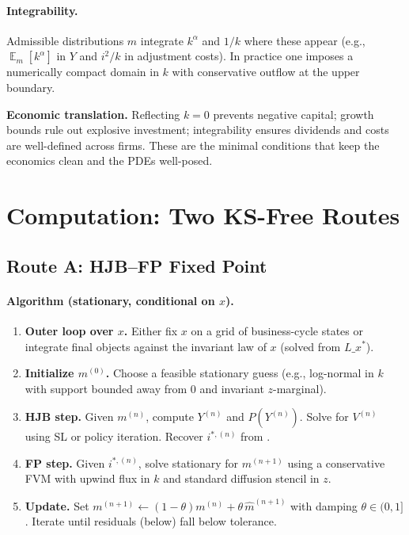 ﻿\documentclass[11pt,letterpaper,oneside]{article}
\numberwithin{equation}{section}
\newcommand{\ac}[1]{{\mdseries\textsc{#1}}}
\DeclareMathOperator{\E}{\mathbb{E}}
\newcommand{\1}{\mathbf{1}}
\newcommand{\Lx}{L\_x}
\begin{document}
\paragraph{Integrability.} Admissible distributions $m$ integrate $k^\alpha$ and $1/k$ where these appear (e.g., $\E_m[k^\alpha]$ in $Y$ and $i^2/k$ in adjustment costs). In practice one imposes a numerically compact domain in $k$ with conservative outflow at the upper boundary.

\begin{tcolorbox}[didacticstyle]
\textbf{Economic translation.} Reflecting $k=0$ prevents negative capital; growth bounds rule out explosive investment; integrability ensures dividends and costs are well-defined across firms. These are the minimal conditions that keep the economics clean and the PDEs well-posed.
\end{tcolorbox}

\section{Computation: Two KS-Free Routes}

\subsection{Route A: \ac{HJB}--\ac{FP} Fixed Point}\label{sec:routeA}

\paragraph{Algorithm (stationary, conditional on $x$).}
\begin{enumerate}[leftmargin=1.5em,label=\textbf{A.\arabic*}]
\item \textbf{Outer loop over $x$.} Either fix $x$ on a grid of business-cycle states or integrate final objects against the invariant law of $x$ (solved from $\Lx^\ast$).
\item \textbf{Initialize $m^{(0)}$.} Choose a feasible stationary guess (e.g., log-normal in $k$ with support bounded away from $0$ and invariant $z$-marginal).
\item \textbf{HJB step.} Given $m^{(n)}$, compute $Y^{(n)}$ and $P(Y^{(n)})$. Solve  for $V^{(n)}$ using \ac{SL} or policy iteration. Recover $i^{*,(n)}$ from .
\item \textbf{FP step.} Given $i^{*,(n)}$, solve stationary  for $m^{(n+1)}$ using a conservative \ac{FVM} with upwind flux in $k$ and standard diffusion stencil in $z$.
\item \textbf{Update.} Set $m^{(n+1)}\leftarrow (1-\theta)m^{(n)}+\theta\,\widehat m^{(n+1)}$ with damping $\theta\in(0,1]$. Iterate until residuals (below) fall below tolerance.
\end{enumerate}
\end{document}
